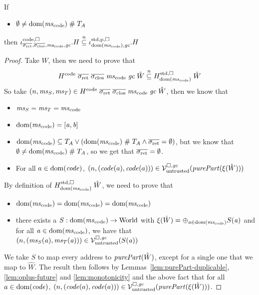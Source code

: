 \documentclass[a4paper]{article}
\begin{document}
\begin{lemma}
  \label{lem:codereg-untrusted-stdreg}
  If
  \begin{itemize}
  \item $\emptyset\neq\dom(\mscode) \mathrel{\#} \ta$
  \end{itemize}
  then $\codereg{\sigrets,\sigcloss,\mscode,\gc}.H \nsubeq \stdreg{\dom(\mscode),\gc}{\pur}.H$ 
\end{lemma}
\begin{proof}
  Take $\hat{W}$, then we need to prove that
  \begin{equation*}
    H^\mathrm{code}\;\sigrets\;\sigcloss\;\mscode\;\gc \; \hat{W} \nsubeq H_{\dom(\mscode)}^{\mathrm{std},\square}\;\hat{W}
  \end{equation*}
  So take $\npair{\ms_S,\ms_T} \in H^\mathrm{code}\;\sigrets\;\sigcloss\;\mscode\;\gc \; \hat{W}$, then we know that
  \begin{itemize}
  \item $\ms_S = \ms_T = \mscode$ 
  \item $\dom(\mscode) =[\aaddr,\baddr]$
  \item $\dom(\mscode) \subseteq \ta \vee (\dom(\mscode)\mathrel{\#} \ta \wedge \sigrets = \emptyset)$, but we know that $\emptyset \neq\dom(\mscode) \mathrel{\#} \ta$, so we get that $\sigrets = \emptyset$.
  \item For all $a \in \mathrm{dom}(\mathit{code})$, $\npair{(\code(a),\code(a))} \in \lrv(\purePart{\xi(\hat{W})})$
  \end{itemize}

  By definition of $H_{\dom(\mscode)}^{\mathrm{std},\square}\;\hat{W}$, we need to prove that
  \begin{itemize}
  \item $\dom(\mscode) = \dom(\mscode) = \dom(\mscode)$
  \item there exists a $S : \dom(\mscode) \fun \World$ with $\xi(\hat{W}) = \oplus_{\aaddr\in\dom(\mscode)} S(\aaddr)$ and for all $\aaddr \in \dom(\mscode)$, we have that $\left(n,(\mathit{ms}_S(\mathit{a}),\mathit{ms}_T(\mathit{a}))\right) \in \mathcal{V}^{\square,\mathit{gc}}_{\mathrm{untrusted}}(S(\mathit{a}))$
  \end{itemize}

  We take $S$ to map every address to $\purePart{\hat{W}}$, except for a single one that we map to $\hat{W}$.
  The result then follows by Lemmas~\ref{lem:purePart-duplicable}, \ref{lem:oplus-future} and \ref{lem:monotonicity} and the above fact that for all $a \in \mathrm{dom}(\mathit{code})$, $\npair{(\code(a),\code(a))} \in \lrv(\purePart{\xi(\hat{W})})$.
\end{proof}
\end{document}
